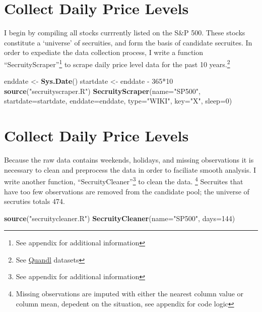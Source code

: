 \documentclass[]{elsarticle} %
\newenvironment{Shaded}{\begin{snugshade}}{\end{snugshade}}
\newcommand{\KeywordTok}[1]{\textcolor[rgb]{0.13,0.29,0.53}{\textbf{{#1}}}}
\newcommand{\DataTypeTok}[1]{\textcolor[rgb]{0.13,0.29,0.53}{{#1}}}
\newcommand{\DecValTok}[1]{\textcolor[rgb]{0.00,0.00,0.81}{{#1}}}
\newcommand{\StringTok}[1]{\textcolor[rgb]{0.31,0.60,0.02}{{#1}}}
\newcommand{\NormalTok}[1]{{#1}}
\begin{document}
\section{Collect Daily Price Levels}\label{collect-daily-price-levels}

I begin by compiling all stocks currrently listed on the S\&P 500. These
stocks constitute a `universe' of secruities, and form the basis of
candidate secruites. In order to expediate the data collection process,
I write a function ``SecruityScraper''\footnote{See appendix for
  additional information} to scrape daily price level data for the past
10 years.\footnote{See \href{https://www.quandl.com/data/WIKI}{Quandl}
  datasets}

\begin{Shaded}
\begin{Highlighting}[]
\NormalTok{enddate <-}\StringTok{ }\KeywordTok{Sys.Date}\NormalTok{()}
\NormalTok{startdate <-}\StringTok{ }\NormalTok{enddate -}\StringTok{ }\DecValTok{365}\NormalTok{*}\DecValTok{10} 
\KeywordTok{source}\NormalTok{(}\StringTok{"secruityscraper.R"}\NormalTok{)}
\KeywordTok{SecruityScraper}\NormalTok{(}\DataTypeTok{name=}\StringTok{"SP500"}\NormalTok{, }
                \DataTypeTok{startdate=}\NormalTok{startdate, }
                \DataTypeTok{enddate=}\NormalTok{enddate, }\DataTypeTok{type=}\StringTok{"WIKI"}\NormalTok{, }
                \DataTypeTok{key=}\StringTok{"X"}\NormalTok{, }\DataTypeTok{sleep=}\DecValTok{0}\NormalTok{)}
\end{Highlighting}
\end{Shaded}

\section{Collect Daily Price Levels}\label{collect-daily-price-levels-1}

Because the raw data contains weekends, holidays, and missing
observations it is necessary to clean and preprocess the data in order
to faciliate smooth analysis. I write another function,
``SecruityCleaner''\footnote{See appendix for additional information} to
clean the data. \footnote{Missing observations are imputed with either
  the nearest column value or column mean, depedent on the situation,
  see appendix for code logic} Secruites that have too few observations
are removed from the candidate pool; the universe of secruties totals
474.

\begin{Shaded}
\begin{Highlighting}[]
\KeywordTok{source}\NormalTok{(}\StringTok{"secruitycleaner.R"}\NormalTok{)}
\KeywordTok{SecruityCleaner}\NormalTok{(}\DataTypeTok{name=}\StringTok{"SP500"}\NormalTok{, }\DataTypeTok{days=}\DecValTok{144}\NormalTok{)}
\end{Highlighting}
\end{Shaded}
\end{document}
